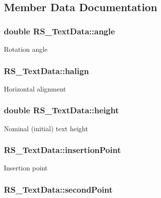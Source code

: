 \subsection{Member Data Documentation}
\hypertarget{classRS__TextData_a14fbd2a26d412ff209f4545b23dc60ef}{
\subsubsection[{angle}]{\setlength{\rightskip}{0pt plus 5cm}double R\-S\-\_\-\-Text\-Data\-::angle}}\label{classRS__TextData_a14fbd2a26d412ff209f4545b23dc60ef}
Rotation angle \hypertarget{classRS__TextData_acc4b864991c706dcfdb2431f33fae240}{
\subsubsection[{halign}]{ R\-S\-\_\-\-Text\-Data\-::halign}}\label{classRS__TextData_acc4b864991c706dcfdb2431f33fae240}
Horizontal alignment \hypertarget{classRS__TextData_a93af79f53dbc2249b7cc831c946ec340}{
\subsubsection[{height}]{\setlength{\rightskip}{0pt plus 5cm}double R\-S\-\_\-\-Text\-Data\-::height}}\label{classRS__TextData_a93af79f53dbc2249b7cc831c946ec340}
Nominal (initial) text height \hypertarget{classRS__TextData_a0505846c1555d91ead9187793430412f}{
\subsubsection[{insertion\-Point}]{ R\-S\-\_\-\-Text\-Data\-::insertion\-Point}}\label{classRS__TextData_a0505846c1555d91ead9187793430412f}
Insertion point \hypertarget{classRS__TextData_a4170b2d8d3cdca3673bb310c38df5e9b}{
\subsubsection[{second\-Point}]{ R\-S\-\_\-\-Text\-Data\-::second\-Point}}\label{classRS__TextData_a4170b2d8d3cdca3673bb310c38df5e9b}
